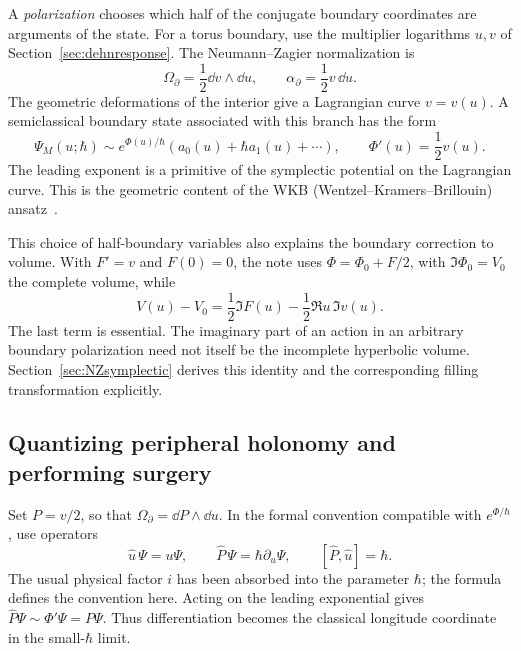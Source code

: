 A \emph{polarization} chooses which half of the conjugate boundary
coordinates are arguments of the state. For a torus boundary,
use the multiplier logarithms $u,v$ of Section~\ref{sec:dehnresponse}.
The Neumann--Zagier normalization is
\begin{equation}
 \Omega_\partial=\frac12\dd v\wedge\dd u,
 \qquad \alpha_\partial=\frac12v\,\dd u.
 \label{eq:introNZpolarization}
\end{equation}
The geometric deformations of the interior give a Lagrangian curve
$v=v(u)$. A semiclassical boundary state associated with this
branch has the form
\begin{equation}
 \Psi_M(u;\hbar)\sim e^{\Phi(u)/\hbar}
       (a_0(u)+\hbar a_1(u)+\cdots),\qquad
 \Phi'(u)=\frac12v(u).
 \label{eq:introWKBstate}
\end{equation}
The leading exponent is a primitive of the symplectic potential
on the Lagrangian curve. This is the geometric content of the WKB
(Wentzel--Kramers--Brillouin) ansatz~\cite{DimofteQuantumRS}.

This choice of half-boundary variables also explains the boundary
correction to volume. With $F'=v$ and $F(0)=0$, the note uses
$\Phi=\Phi_0+F/2$, with $\Im\Phi_0=V_0$ the complete volume, while
\begin{equation}
 V(u)-V_0=\frac12\Im F(u)-\frac12\Re u\,\Im v(u).
 \label{eq:introvolumeboundary}
\end{equation}
The last term is essential. The imaginary part of an action in an
arbitrary boundary polarization need not itself be the incomplete
hyperbolic volume. Section~\ref{sec:NZsymplectic} derives this
identity and the corresponding filling transformation explicitly.

\subsection{Quantizing peripheral holonomy and performing surgery}
\label{sec:introquantization}

Set $P=v/2$, so that $\Omega_\partial=\dd P\wedge\dd u$.
In the formal convention compatible with
$e^{\Phi/\hbar}$, use operators
\begin{equation}
 \widehat u\,\Psi=u\Psi,\qquad
 \widehat P\,\Psi=\hbar\partial_u\Psi,
 \qquad [\widehat P,\widehat u]=\hbar.
 \label{eq:introcommutator}
\end{equation}
The usual physical factor $i$ has been absorbed into the parameter
$\hbar$; the formula defines the convention here. Acting on the
leading exponential gives $\widehat P\Psi\sim\Phi'\Psi=P\Psi$.
Thus differentiation becomes the classical longitude coordinate
in the small-$\hbar$ limit.

